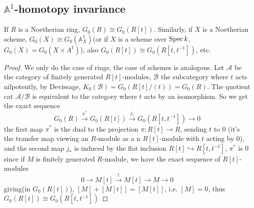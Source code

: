 \documentclass[main]{subfiles}
\begin{document}
\subsection{$\mathbb A^1$-homotopy invariance}
If $R$ is a Noetherian ring, $G_0(R)\cong G_0(R[t])$. Similarly, if $X$ is a Noetherian scheme, $G_0(X)\cong G_0(\mathbb A^1_X)$(or if $X$ is a scheme over $\operatorname{Spec} k$, $G_0(X)=G_0(X\times A^1)$), also $G_0(R[t])\cong G_0(R[t,t^{-1}])$, etc.

\begin{proof}
We only do the case of rings, the case of schemes is analogous. Let $\mathscr A$ be the category of finitely generated $R[t]$-modules, $\mathscr B$ the subcategory where $t$ acts nilpotently, by Devissage, $K_0(\mathscr B)=G_0(R[t]/(t))=G_0(R)$. The quotient cat $\mathscr A/\mathscr B$ is equivalent to the category where $t$ acts by an isomorphism. So we get the exact sequence
\[
G_0(R)\xrightarrow{\pi^*} G_0(R[t])\xrightarrow{j_*} G_0(R[t,t^{-1}])\to0
\]
the first map $\pi^*$ is the dual to the projection $\pi:R[t]\to R$, sending $t$ to 0 (it's the transfer map viewing an $R$-module as a n $R[t]$-module with $t$ acting by 0), and the second map $j_*$ is induced by the flat inclusion $R[t]\hookrightarrow R[t,t^{-1}]$, $\pi^*$ is 0 since if $M$ is finitely generated $R$-module, we have the exact sequence of $R[t]$-modules
\[0\to M[t]\xrightarrow{t} M[t]\to M\to0\]
giving(in $G_0(R[t])$), $[M]+[M[t]]=[M[t]]$, i.e. $[M]=0$, thus $G_0(R[t])\cong G_0(R[t,t^{-1}])$

\end{proof}
\end{document}
